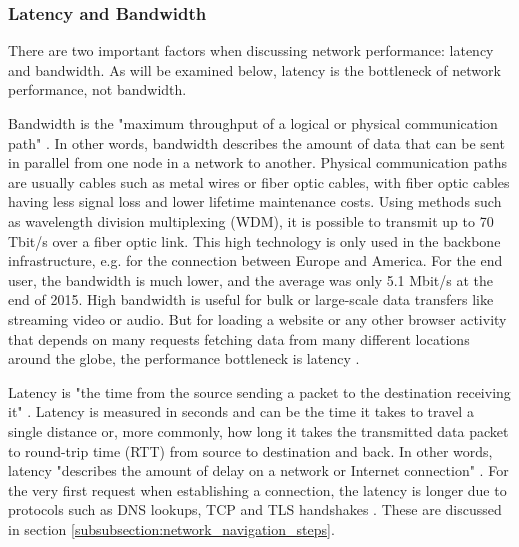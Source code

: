 

\subsubsection{Latency and Bandwidth} %
\label{subsubsection:latency_bandwidth}

There are two important factors when discussing network performance: latency and bandwidth.
As will be examined below, latency is the bottleneck of network performance, not bandwidth.


Bandwidth is the "maximum throughput of a logical or physical communication path" \cite{2013Grigorik}.
In other words, bandwidth describes the amount of data that can be sent in parallel from one node in a network to another. 
Physical communication paths are usually cables such as metal wires or fiber optic cables, with fiber optic cables having less signal loss and lower lifetime maintenance costs.
Using methods such as wavelength division multiplexing (WDM), it is possible to transmit up to 70 Tbit/s over a fiber optic link.
This high technology is only used in the backbone infrastructure, e.g. for the connection between Europe and America.
For the end user, the bandwidth is much lower, and the average was only 5.1 Mbit/s at the end of 2015.
High bandwidth is useful for bulk or large-scale data transfers like streaming video or audio.
But for loading a website or any other browser activity that depends on many requests fetching data from many different locations around the globe, the performance bottleneck is latency \cite{2013Grigorik}.


Latency is "the time from the source sending a packet to the destination receiving it" \cite{2013Grigorik}.
Latency is measured in seconds and can be the time it takes to travel a single distance or, more commonly, how long it takes the transmitted data packet to round-trip time (RTT) from source to destination and back.
In other words, latency "describes the amount of delay on a network or Internet connection" \cite{2021MDNLatency}.
For the very first request when establishing a connection, the latency is longer due to protocols such as DNS lookups, TCP and TLS handshakes \cite{2021MDNLatency}.
These are discussed in section \ref{subsubsection:network_navigation_steps}.


